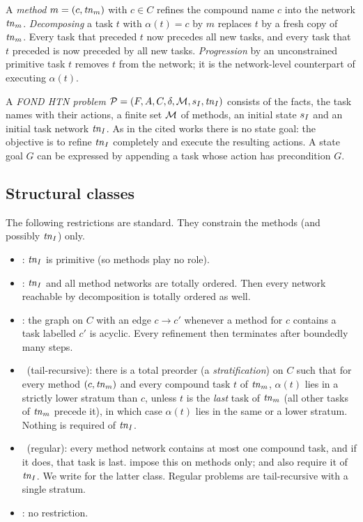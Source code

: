 A \emph{method} $m=(c,\mathit{tn}_m)$ with $c\in C$ refines the compound name $c$ into the network
$\mathit{tn}_m$. \emph{Decomposing} a task $t$ with $\alpha(t)=c$ by $m$ replaces $t$ by a fresh copy of
$\mathit{tn}_m$. Every task that preceded $t$ now precedes all new tasks, and every task that $t$
preceded is now preceded by all new tasks. \emph{Progression} by an unconstrained primitive task $t$
removes $t$ from the network; it is the network-level counterpart of executing $\alpha(t)$.

A \emph{FOND HTN problem} $\mathcal{P}=(F,A,C,\delta,\mathcal{M},s_I,\mathit{tn}_I)$ consists of the facts, the task
names with their actions, a finite set $\mathcal{M}$ of methods, an initial state $s_I$ and an initial
task network $\mathit{tn}_I$. As in the cited works there is no state goal: the objective is to refine
$\mathit{tn}_I$ completely and execute the resulting actions. A state goal $G$ can be expressed by
appending a task whose action has precondition $G$.

\subsection{Structural classes}

The following restrictions are standard. They constrain the methods (and possibly $\mathit{tn}_I$) only.

\begin{itemize}
  \item \PRIM: $\mathit{tn}_I$ is primitive (so methods play no role).
  \item \TO: $\mathit{tn}_I$ and all method networks are totally ordered. Then every network reachable by
    decomposition is totally ordered as well.
  \item \ACYC: the graph on $C$ with an edge $c\to c'$ whenever a method for $c$ contains a task
    labelled $c'$ is acyclic. Every refinement then terminates after boundedly many steps.
  \item \TR\ (tail-recursive): there is a total preorder (a \emph{stratification}) on $C$ such
    that for every method $(c,\mathit{tn}_m)$ and every compound task $t$ of $\mathit{tn}_m$, $\alpha(t)$ lies in
    a strictly lower stratum than $c$, unless $t$ is the \emph{last} task of $\mathit{tn}_m$ (all other
    tasks of $\mathit{tn}_m$ precede it), in which case $\alpha(t)$ lies in the same or a lower stratum.
    Nothing is required of $\mathit{tn}_I$.
  \item \REG\ (regular): every method network contains at most one compound task, and if it does,
    that task is last. \textcite{bercher:et:al:ijcai-19} impose this on methods only;
    \textcite{erol:et:al:amai-96} and \CBa{} also require it of $\mathit{tn}_I$. We write \REGtn{} for the
    latter class. Regular problems are tail-recursive with a single stratum.
  \item \ARB: no restriction.
\end{itemize}

